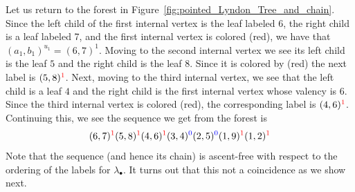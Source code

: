 \documentclass[11pt]{article}
\theoremstyle{definition}
\numberwithin{equation}{section}
\newcommand{\tre}[1]{{\color{red}{#1}}}
\newcommand{\tbl}[1]{{\color{blue}{#1}}}
\begin{document}
Let us return to the forest in Figure~\ref{fig:pointed_Lyndon_Tree_and_chain}. Since the left child of the first internal vertex is the leaf labeled 6, the right child is a leaf labeled 7, and the first internal vertex is colored \tre{1} (red), we have that $(a_1,b_1)^{u_1} = (6,7)^1$. Moving to the second internal vertex we see its left child is the leaf $5$ and the right child is the leaf $8$. Since it is colored by \tre{1} (red) the next label is $(5,8)^{\tre{1}}$.  Next, moving to the third internal vertex, we see that the left child is a leaf $4$ and the right child is the first internal vertex  whose valency is 6. Since the third internal vertex is colored \tre{1} (red), the corresponding label is $(4,6)^{\tre{1}}$.   Continuing this, we see the sequence we get from the forest is 
$$
(6,7)^{\tre{1}} (5,8)^{\tre{1}} (4,6)^{\tre{1}}  (3,4)^{\tbl{0}} (2,5)^{\tbl{0}} (1,9)^{\tre{1}} (1,2)^{\tre{1}}
$$
 Note that the sequence (and hence its chain) is ascent-free with respect to the ordering of the labels for $\lambda_\bullet$.   It turns out that this not a coincidence as we show next.
\end{document}
